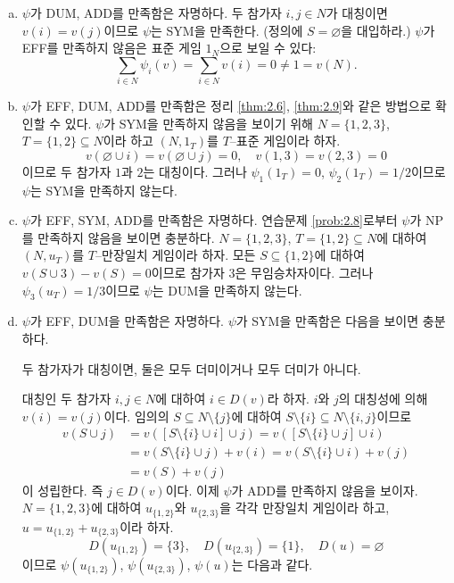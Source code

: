 \documentclass{article}
\numberwithin{equation}{section}
\begin{document}
\begin{sol}
	\begin{enumerate}[(a)]
		\item $\psi$가 DUM, ADD를 만족함은 자명하다. 두 참가자 $i,j\in N$가 대칭이면 $v(i)=v(j)$이므로 $\psi$는 SYM을 만족한다. (정의에 $S=\varnothing$을 대입하라.) $\psi$가 EFF를 만족하지 않음은 표준 게임 $1_N$으로 보일 수 있다:
			\[
				\sum_{i\in N}\psi_i(v)=\sum_{i\in N}v(i)=0\ne 1=v(N).
			\]
		\item $\psi$가 EFF, DUM, ADD를 만족함은 정리 \ref{thm:2.6}, \ref{thm:2.9}와 같은 방법으로 확인할 수 있다. $\psi$가 SYM을 만족하지 않음을 보이기 위해 $N=\{1,2,3\}$, $T=\{1,2\}\subseteq N$이라 하고 $(N,1_T)$를 $T$--표준 게임이라 하자.
			\[
				v(\varnothing\cup i)=v(\varnothing\cup j)=0,\quad v(1,3)=v(2,3)=0
			\]
			이므로 두 참가자 $1$과 $2$는 대칭이다. 그러나 $\psi_1(1_T)=0$, $\psi_2(1_T)=1/2$이므로 $\psi$는 SYM을 만족하지 않는다.
		\item $\psi$가 EFF, SYM, ADD를 만족함은 자명하다. 연습문제 \ref{prob:2.8}로부터 $\psi$가 NP를 만족하지 않음을 보이면 충분하다. $N=\{1,2,3\}$, $T=\{1,2\}\subseteq N$에 대하여 $(N,u_T)$를 $T$--만장일치 게임이라 하자. 모든 $S\subseteq\{1,2\}$에 대하여 $v(S\cup 3)-v(S)=0$이므로 참가자 $3$은 무임승차자이다. 그러나 $\psi_3(u_T)=1/3$이므로 $\psi$는 DUM을 만족하지 않는다.
		\item $\psi$가 EFF, DUM을 만족함은 자명하다. $\psi$가 SYM을 만족함은 다음을 보이면 충분하다.
			\begin{lemma*}{}{}
				두 참가자가 대칭이면, 둘은 모두 더미이거나 모두 더미가 아니다.
			\end{lemma*}
			대칭인 두 참가자 $i,j\in N$에 대하여 $i\in D(v)$라 하자. $i$와 $j$의 대칭성에 의해 $v(i)=v(j)$이다. 임의의 $S\subseteq N\setminus\{j\}$에 대하여 $S\setminus\{i\}\subseteq N\setminus\{i,j\}$이므로
			\[
				\begin{aligned}
					v(S\cup j)&=v([S\setminus\{i\}\cup i]\cup j)=v([S\setminus\{i\}\cup j]\cup i)\\
					&=v(S\setminus\{i\}\cup j)+v(i)=v(S\setminus\{i\}\cup i)+v(j)\\
					&=v(S)+v(j)
				\end{aligned}
			\]
			이 성립한다. 즉 $j\in D(v)$이다. 이제 $\psi$가 ADD를 만족하지 않음을 보이자. $N=\{1,2,3\}$에 대하여 $u_{\{1,2\}}$와 $u_{\{2,3\}}$을 각각 만장일치 게임이라 하고, $u=u_{\{1,2\}}+u_{\{2,3\}}$이라 하자.
			\[
				D(u_{\{1,2\}})=\{3\},\quad D(u_{\{2,3\}})=\{1\},\quad D(u)=\varnothing
			\]
			이므로 $\psi(u_{\{1,2\}})$, $\psi(u_{\{2,3\}})$, $\psi(u)$는 다음과 같다.

\end{enumerate}
\end{sol}
\end{document}
